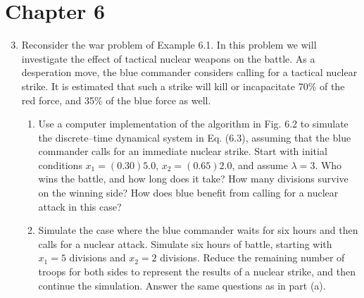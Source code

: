 \documentclass[12pt, oneside]{book}
\newenvironment{solution}{\textit{Solution.}}
\newcommand{\sol}[1]{
    \begin{customframedproof}[linecolor=orangehdx!75,]
        \begin{solution}
        #1
        \end{solution}
    \end{customframedproof}
}
\begin{document}



\section*{Chapter 6}

\begin{enumerate}
    \setcounter{enumi}{2}
    \item Reconsider the war problem of Example 6.1. In this problem we will investigate the effect of tactical nuclear weapons on the battle. As a desperation move, the blue commander considers calling for a tactical nuclear strike. It is estimated that such a strike will kill or incapacitate 70\% of the red force, and 35\% of the blue force as well.
    \begin{enumerate}
        \item Use a computer implementation of the algorithm in Fig. 6.2 to simulate the discrete–time dynamical system in Eq. (6.3), assuming that the blue commander calls for an immediate nuclear strike. Start with initial conditions \(x_{1} = (0.30)5.0\), \(x_{2} = (0.65)2.0\), and assume \(\lambda = 3\). Who wins the battle, and how long does it take? How many divisions survive on the winning side? How does blue benefit from calling for a nuclear attack in this case?
        \item  Simulate the case where the blue commander waits for six hours and then calls for a nuclear attack. Simulate six hours of battle, starting with \(x_{1} = 5\) divisions and \(x_{2} = 2\) divisions. Reduce the remaining number of troops for both sides to represent the results of a nuclear strike, and then continue the simulation. Answer the same questions as in part (a).
\end{enumerate}
\end{enumerate}
\end{document}
